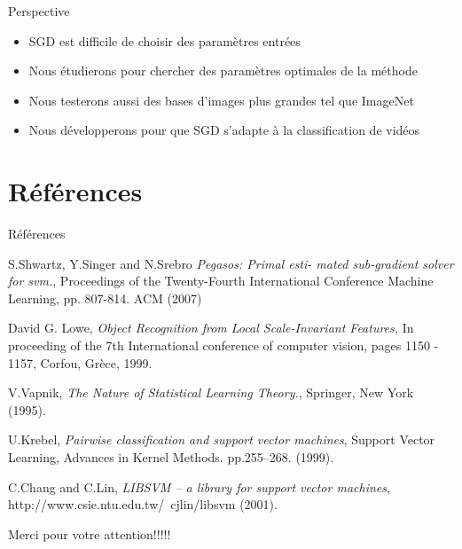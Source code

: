 \documentclass[11pt]{beamer}
\begin{document}
\begin{otherlanguage}{french}
\begin{frame}{Perspective}
\begin{itemize}
\item SGD est difficile de choisir des paramètres entrées
\pause
\item Nous étudierons pour chercher des paramètres optimales de la méthode
\pause
\item Nous testerons aussi des bases d'images plus grandes tel que ImageNet
\pause
\item Nous développerons pour que SGD s'adapte à la classification de vidéos
\end{itemize}
\end{frame}


\end{otherlanguage}

\section*{Références}
\begin{small}

\begin{frame}{Références}
\begin{thebibliography}{9}

 S.Shwartz, Y.Singer and N.Srebro \emph{ Pegasos: Primal esti-
mated sub-gradient solver for svm.}, Proceedings of the Twenty-Fourth International Conference Machine Learning, pp. 807-814. ACM (2007)

 David G. Lowe, \emph{Object Recognition from Local Scale-Invariant Features,} In proceeding of the 7th International conference of computer vision, pages 1150 - 1157, Corfou, Grèce, 1999.
 
 V.Vapnik, \emph{The Nature of Statistical Learning Theory.}, Springer, New York (1995).

 U.Krebel, \emph{Pairwise classification and support vector machines}, Support Vector Learning, Advances in Kernel Methods. pp.255–268. (1999).

 C.Chang and C.Lin, \emph{LIBSVM – a library for support vector machines}, http://www.csie.ntu.edu.tw/~cjlin/libsvm (2001).


\end{thebibliography}
\end{frame}

\end{small}

\begin{frame}
 \Huge Merci pour votre attention!!!!!
\end{frame}
\end{document}
